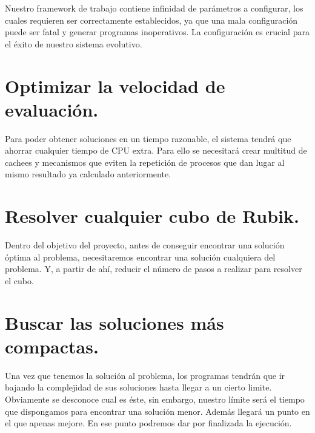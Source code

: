 Nuestro framework de trabajo contiene infinidad de parámetros a configurar, los
cuales requieren ser correctamente establecidos, ya que una mala configuración
puede ser fatal y generar programas inoperativos. La configuración es crucial
para el éxito de nuestro sistema evolutivo.

\section{Optimizar la velocidad de evaluación.}

Para poder obtener soluciones en un tiempo razonable, el sistema tendrá que
ahorrar cualquier tiempo de CPU extra. Para ello se necesitará crear multitud de
cachees y mecanismos que eviten la repetición de procesos que dan lugar al mismo
resultado ya calculado anteriormente.

\section{Resolver cualquier cubo de Rubik.}

Dentro del objetivo del proyecto, antes de conseguir encontrar una solución
óptima al problema, necesitaremos encontrar una solución cualquiera del problema.
Y, a partir de ahí, reducir el número de pasos a realizar para resolver el cubo.

\section{Buscar las soluciones más compactas.}

Una vez que tenemos la solución al problema, los programas tendrán que ir bajando
la complejidad de sus soluciones hasta llegar a un cierto limite. Obviamente se
desconoce cual es éste, sin embargo, nuestro límite será el tiempo que
dispongamos para encontrar una solución menor. Además llegará un punto en el que
apenas mejore. En ese punto podremos dar por finalizada la ejecución.
